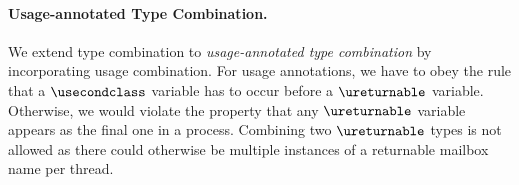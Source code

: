 %

\paragraph{Usage-annotated Type Combination.}
We extend type combination to \emph{usage-annotated type combination} by incorporating usage combination.
For usage annotations, we have to obey the rule that a $\usecondclass$ variable has to occur before a $\ureturnable$ variable.
Otherwise, we would violate the property that any $\ureturnable$ variable appears as the final one in a process.
Combining two $\ureturnable$ types is not allowed as there could otherwise be multiple instances of a returnable mailbox name per thread.

